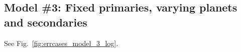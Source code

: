 \subsection{Model \#3: Fixed primaries, varying planets and secondaries}
\label{sec:model_3}

See Fig.~\ref{fig:errcases_model_3_log}.